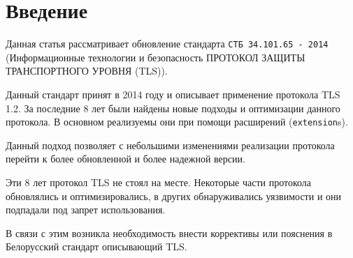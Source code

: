 \section{Введение}

Данная статья рассматривает обновление стандарта \texttt{СТБ 34.101.65 - 2014 }(Информационные технологии и безопасность
ПРОТОКОЛ ЗАЩИТЫ ТРАНСПОРТНОГО УРОВНЯ (TLS)). 

Данный стандарт принят в 2014 году и описывает применение протокола TLS 1.2. За последние 8 лет были найдены новые подходы и оптимизации данного протокола. В основном реализуемы они при помощи расширений (\texttt{extension}s). 

Данный подход позволяет с небольшими изменениями реализации протокола перейти к более обновленной и более надежной версии. 

Эти 8 лет протокол TLS не стоял на месте. Некоторые части протокола обновлялись и оптимизировались, в других обнаруживались уязвимости и они подпадали под запрет использования.

В связи с этим возникла необходимость внести коррективы или пояснения в Белорусский стандарт описывающий TLS.



